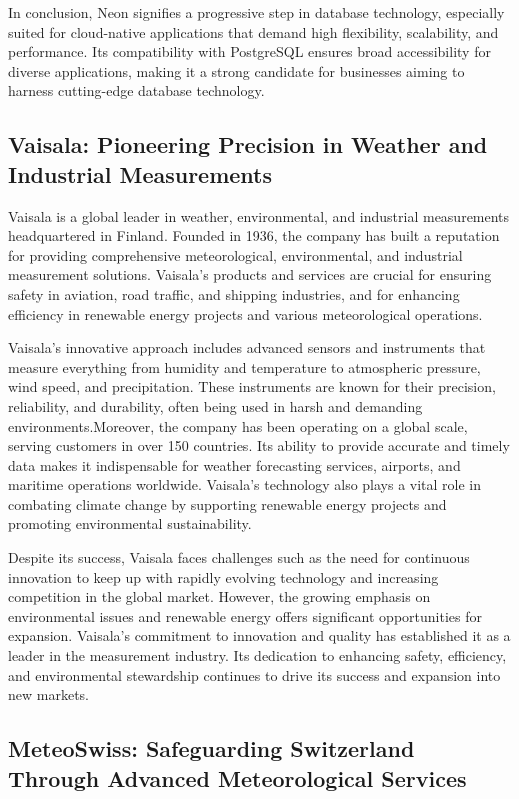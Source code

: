 In conclusion, Neon signifies a progressive step in database technology,
especially suited for cloud-native applications that demand high flexibility,
scalability, and performance. Its compatibility with PostgreSQL ensures broad
accessibility for diverse applications, making it a strong candidate for
businesses aiming to harness cutting-edge database technology.

\subsection{Vaisala: Pioneering Precision in Weather and Industrial Measurements}

Vaisala is a global leader in weather, environmental, and industrial
measurements headquartered in Finland. Founded in 1936, the company has built a
reputation for providing comprehensive meteorological, environmental, and
industrial measurement solutions. Vaisala's products and services are crucial
for ensuring safety in aviation, road traffic, and shipping industries, and for
enhancing efficiency in renewable energy projects and various meteorological
operations.

Vaisala's innovative approach includes advanced sensors and instruments that
measure everything from humidity and temperature to atmospheric pressure, wind
speed, and precipitation. These instruments are known for their precision,
reliability, and durability, often being used in harsh and demanding
environments.Moreover, the company has been operating on a global scale, serving
customers in over 150 countries. Its ability to provide accurate and timely data
makes it indispensable for weather forecasting services, airports, and maritime
operations worldwide. Vaisala's technology also plays a vital role in combating
climate change by supporting renewable energy projects and promoting
environmental sustainability.

Despite its success, Vaisala faces challenges such as the need for continuous
innovation to keep up with rapidly evolving technology and increasing
competition in the global market. However, the growing emphasis on environmental
issues and renewable energy offers significant opportunities for expansion.
Vaisala's commitment to innovation and quality has established it as a leader in
the measurement industry. Its dedication to enhancing safety, efficiency, and
environmental stewardship continues to drive its success and expansion into new
markets.

\subsection{MeteoSwiss: Safeguarding Switzerland Through Advanced Meteorological Services}

